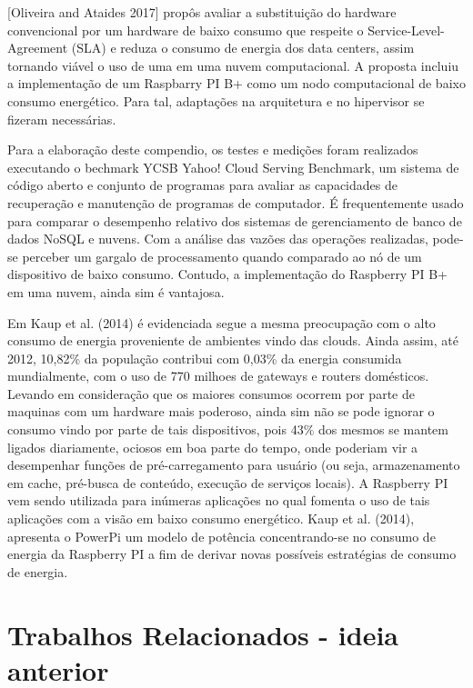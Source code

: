 \documentclass[12pt,english,brazil]{article}
\begin{document}
[Oliveira and Ataides 2017] propôs avaliar a substituição do hardware convencional por um hardware de baixo consumo que respeite o Service-Level-Agreement (SLA) e reduza o consumo de energia dos data centers, assim tornando viável o uso de uma em uma nuvem computacional. A proposta incluiu a implementação de um Raspbarry PI B+ como um nodo computacional de baixo consumo energético. Para tal, adaptações na arquitetura e no hipervisor  se fizeram necessárias.

Para a elaboração deste compendio, os testes e medições foram realizados executando o bechmark YCSB Yahoo! Cloud Serving Benchmark, um sistema de código aberto e conjunto de programas para avaliar as capacidades de recuperação e manutenção de programas de computador. É frequentemente usado para comparar o desempenho relativo dos sistemas de gerenciamento de banco de dados NoSQL e nuvens. Com a análise das vazões das operações realizadas, pode-se perceber um gargalo de processamento quando comparado ao nó de um dispositivo de baixo consumo. Contudo, a implementação do Raspberry PI B+ em uma nuvem, ainda sim é vantajosa.

Em Kaup et al. (2014) é evidenciada segue a mesma preocupação com o alto consumo de energia proveniente de ambientes vindo das clouds. Ainda assim, até 2012, 10,82\% da população contribui com 0,03\% da energia consumida mundialmente, com o uso de 770 milhoes de gateways e routers domésticos. Levando em consideração que os maiores consumos ocorrem por parte de maquinas com um hardware mais poderoso, ainda sim não se pode ignorar o consumo vindo por parte de tais dispositivos, pois 43\% dos mesmos se mantem ligados diariamente, ociosos em boa parte do tempo, onde poderiam vir a desempenhar funções de pré-carregamento para usuário (ou seja, armazenamento em cache, pré-busca de conteúdo, execução de serviços locais). A Raspberry PI vem sendo utilizada para inúmeras aplicações no qual fomenta o uso de tais aplicações com a visão em baixo consumo energético. Kaup et al. (2014), apresenta o PowerPi um modelo de  potência concentrando-se no consumo de energia da Raspberry PI a fim de derivar novas possíveis estratégias de consumo de energia.



\section{Trabalhos Relacionados - ideia anterior} \label{sec:TrabalhosRelacionados}
\end{document}
